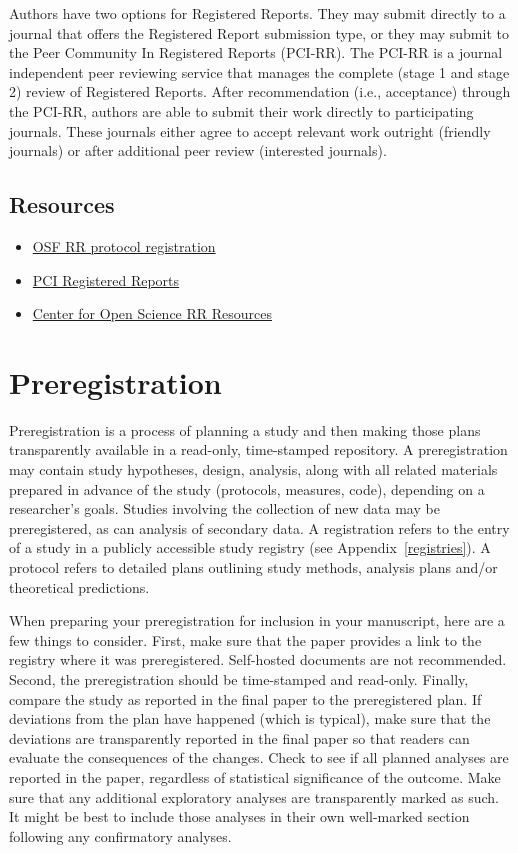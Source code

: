 \documentclass[
  oneside]{book}
\providecommand{\tightlist}{%
  \setlength{\itemsep}{0pt}\setlength{\parskip}{0pt}}
\begin{document}
Authors have two options for Registered Reports. They may submit directly to a journal that offers the Registered Report submission type, or they may submit to the Peer Community In Registered Reports (PCI-RR). The PCI-RR is a journal independent peer reviewing service that manages the complete (stage 1 and stage 2) review of Registered Reports. After recommendation (i.e., acceptance) through the PCI-RR, authors are able to submit their work directly to participating journals. These journals either agree to accept relevant work outright (friendly journals) or after additional peer review (interested journals).

\hypertarget{resources-7}{%
\section{Resources}\label{resources-7}}

\begin{itemize}
\tightlist
\item
  \href{https://osf.io/rr/}{OSF RR protocol registration}
\item
  \href{https://rr.peercommunityin.org/}{PCI Registered Reports}
\item
  \href{https://www.cos.io/initiatives/registered-reports}{Center for Open Science RR Resources}
\end{itemize}

\hypertarget{authors-prereg}{%
\chapter{Preregistration}\label{authors-prereg}}

Preregistration is a process of planning a study and then making those plans transparently available in a read-only, time-stamped repository. A preregistration may contain study hypotheses, design, analysis, along with all related materials prepared in advance of the study (protocols, measures, code), depending on a researcher's goals. Studies involving the collection of new data may be preregistered, as can analysis of secondary data. A registration refers to the entry of a study in a publicly accessible study registry (see Appendix~\ref{registries}). A protocol refers to detailed plans outlining study methods, analysis plans and/or theoretical predictions.

When preparing your preregistration for inclusion in your manuscript, here are a few things to consider. First, make sure that the paper provides a link to the registry where it was preregistered. Self-hosted documents are not recommended. Second, the preregistration should be time-stamped and read-only. Finally, compare the study as reported in the final paper to the preregistered plan. If deviations from the plan have happened (which is typical), make sure that the deviations are transparently reported in the final paper so that readers can evaluate the consequences of the changes. Check to see if all planned analyses are reported in the paper, regardless of statistical significance of the outcome. Make sure that any additional exploratory analyses are transparently marked as such. It might be best to include those analyses in their own well-marked section following any confirmatory analyses.
\end{document}
